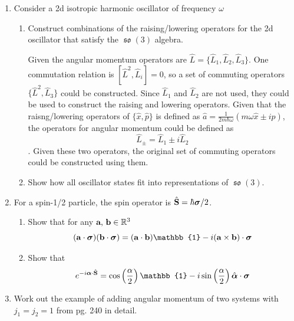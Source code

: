 \documentclass[10pt,letterpaper]{article}
\newcommand{\lie}[1]{\operatorname{\mathfrak{#1}}}
\begin{document}
\begin{enumerate}
\item Consider a 2d isotropic harmonic oscillator of frequency $\omega$

\begin{enumerate}

\item Construct combinations of the raising/lowering operators for the 2d oscillator that satisfy the $\lie{so}(3)$ algebra. 

\color{violet}
Given the angular momentum operators are $\hat{L} = \{ \hat{L}_{1}, \hat{L}_{2}, \hat{L}_{3} \}$. One commutation relation is $[\hat{L}^{2}, \hat{L}_{i} ] = 0$, so a set of commuting operators $\{ \hat{L}^{2}, \hat{L}_{3} \}$ could be constructed. Since $\hat{L}_{1}$ and $\hat{L}_{2}$ are not used, they could be used to construct the raising and lowering operators. Given that the raisng/lowering operators of $\{ \hat{x}, \hat{p} \}$ is defined as $\hat{a} = \frac{1}{2m\hbar\omega} (m\omega\hat{x} \pm i\hat{p})$, the operators for angular momentum could be defined as
$$\hat{L}_{\pm} = \hat{L}_{1} \pm i\hat{L}_{2}$$. 
Given these two operators, the original set of commuting operators could be constructed using them. 
\color{black}

\item Show how all oscillator states fit into representations of $\lie{so}(3)$. 

\end{enumerate}

\item For a spin-1/2 particle, the spin operator is $\hat{\text{\textbf{S}}} = \hbar\boldsymbol{\sigma}/2 $. 

\begin{enumerate}

\item Show that for any $\text{\textbf{a}, \textbf{b}} \in \mathbb{R}^{3}$
$$(\text{\textbf{a}} \cdot \boldsymbol{\sigma})(\text{\textbf{b}} \cdot \boldsymbol{\sigma}) = (\text{\textbf{a}} \cdot \text{\textbf{b}})\mathbb{1} - i(\text{\textbf{a}} \times \text{\textbf{b}}) \cdot \boldsymbol{\sigma}$$

\color{violet}

\color{black}

\item Show that
$$e^{-i\boldsymbol{\alpha} \cdot \hat{\text{\textbf{S}}}} = \cos\left( \frac{\alpha}{2} \right)\mathbb{1} - i\sin\left( \frac{\alpha}{2} \right)\hat{\boldsymbol{\alpha}} \cdot \boldsymbol{\sigma}$$

\end{enumerate}

\item Work out the example of adding angular momentum of two systems with $j_{1} = j_{2} = 1$ from pg. 240 in detail.

\end{enumerate}	
\end{document}
